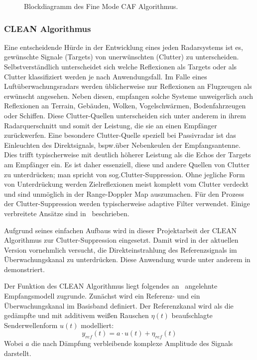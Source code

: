\begin{figure}[htb]

    \caption{Blockdiagramm des Fine Mode CAF Algorithmus.\label{fig:caf_fine_mode_schematics}}
\end{figure}

\subsubsection{CLEAN Algorithmus}

Eine entscheidende Hürde in der Entwicklung eines jeden Radarsystems ist es, gewünschte Signale (Targets) von unerwünschten (Clutter) zu unterscheiden. Selbstverständlich unterscheidet sich welche Reflexionen als Targets oder als Clutter klassifiziert werden je nach Anwendungsfall. Im Falle eines Luftüberwachungsradars werden üblicherweise nur Reflexionen an Flugzeugen als erwünscht angesehen. Neben diesen, empfangen solche Systeme unweigerlich auch Reflexionen an Terrain, Gebäuden, Wolken, Vogelschwärmen, Bodenfahrzeugen oder Schiffen. Diese Clutter-Quellen unterscheiden sich unter anderem in ihrem Radarquerschnitt und somit der Leistung, die sie an einen Empfänger zurückwerfen. Eine besondere Clutter-Quelle speziell bei Passivradar ist das Einleuchten des Direktsignals, bspw.\@ über Nebenkeulen der Empfangsantenne. Dies trifft typischerweise mit deutlich höherer Leistung als die Echos der Targets am Empfänger ein. Es ist daher essenziell, diese und andere Quellen von Clutter zu unterdrücken; man spricht von sog.\@ Clutter-Suppression. Ohne jegliche Form von Unterdrückung werden Zielreflexionen meist komplett vom Clutter verdeckt und sind unmöglich in der Range-Doppler Map auszumachen. Für den Prozess der Clutter-Suppression werden typischerweise adaptive Filter verwendet. Einige verbreitete Ansätze sind in~\cite[S.~177--202]{Malanowski2019} beschrieben.

Aufgrund seines einfachen Aufbaus wird in dieser Projektarbeit der CLEAN Algorithmus zur Clutter-Suppression eingesetzt. Damit wird in der aktuellen Version vornehmlich versucht, die Direkteinstrahlung des Referenzsignals im Überwachungskanal zu unterdrücken. Diese Anwendung wurde unter anderem in~\cite{Feng2013} demonstriert.

Der Funktion des CLEAN Algorithmus liegt folgendes an~\cite{Kulpa2008} angelehnte Empfangsmodell zugrunde. Zunächst wird ein Referenz- und ein Überwachungskanal im Basisband definiert. Der Referenzkanal wird als die gedämpfte und mit additivem weißen Rauschen \(\eta (t)\) beaufschlagte Senderwellenform \(u (t)\) modelliert:
%
\begin{equation}
    y_{ref} (t) = a \cdot u (t) + \eta_{ref} (t)
\end{equation}\label{equ:clean_reference_channel}%
%
Wobei \(a\) die nach Dämpfung verbleibende komplexe Amplitude des Signals darstellt.

